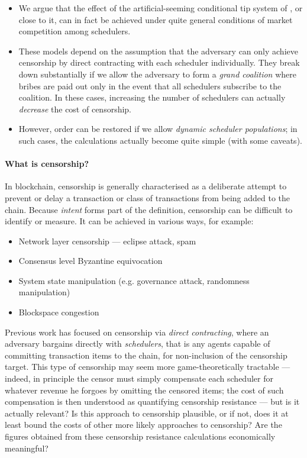 \begin{itemize}
  \item
    We argue that the effect of the artificial-seeming conditional tip system of \cite{FPR}, or close to it, can in fact be achieved under quite general conditions of market competition among schedulers.
    
  \item
    These models depend on the assumption that the adversary can only achieve censorship by direct contracting with each scheduler individually.
    They break down substantially if we allow the adversary to form a \emph{grand coalition} where bribes are paid out only in the event that all schedulers subscribe to the coalition.
    In these cases, increasing the number of schedulers can actually \emph{decrease} the cost of censorship.

  \item
    However, order can be restored if we allow \emph{dynamic scheduler populations}; in such cases, the calculations actually become quite simple (with some caveats).

\end{itemize}


\paragraph{What is censorship?}
%
In blockchain, censorship is generally characterised as a deliberate attempt to prevent or delay a transaction or class of transactions from being added to the chain.
%
Because \emph{intent} forms part of the definition, censorship can be difficult to identify or measure.
%
It can be achieved in various ways, for example:
\begin{itemize}
  \item Network layer censorship --- eclipse attack, spam
  \item Consensus level Byzantine equivocation
  \item System state manipulation (e.g. governance attack, randomness manipulation)
  \item Blockspace congestion
\end{itemize}

Previous work \cite{FPR} has focused on censorship via \emph{direct contracting}, where an adversary bargains directly with \emph{schedulers}, that is any agents capable of committing transaction items to the chain, for non-inclusion of the censorship target.
%
This type of censorship may seem more game-theoretically tractable --- indeed, in principle the censor must simply compensate each scheduler for whatever revenue he forgoes by omitting the censored items; the cost of such compensation is then understood as quantifying censorship resistance --- but is it actually relevant?
%
Is this approach to censorship plausible, or if not, does it at least bound the costs of other more likely approaches to censorship?
%
Are the figures obtained from these censorship resistance calculations economically meaningful?

